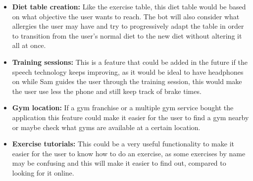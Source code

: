 \begin{itemize}
	\item{\textbf{Diet table creation:} Like the exercise table, this diet table would be based on what objective the user wants to reach. The bot will also consider what allergies the user may have and try to progressively adapt the table in order to transition from the user’s normal diet to the new diet without altering it all at once.}
	\item{\textbf{Training sessions:} This is a feature that could be added in the future if the speech technology keeps improving, as it would be ideal to have headphones on while Sam guides the user through the training session, this would make the user use less the phone and still keep track of brake times.}
	\item{\textbf{Gym location:} If a gym franchise or a multiple gym service bought the application this feature could make it easier for the user to find a gym nearby or maybe check what gyms are available at a certain location.}
	\item{\textbf{Exercise tutorials:} This could be a very useful functionality to make it easier for the user to know how to do an exercise, as some exercises by name may be confusing and this will make it easier to find out, compared to looking for it online.}
	\begin{table}
		\centering
		

\end{table}
\end{itemize}
